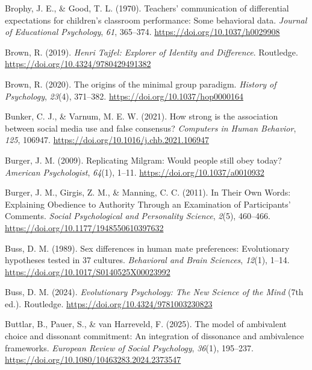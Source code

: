 \documentclass[
  letterpaper,
]{book}
\newlength{\cslhangindent}
\newenvironment{CSLReferences}[2] %
 {\begin{list}{}{%
  \setlength{\itemindent}{0pt}
  \setlength{\leftmargin}{0pt}
  \setlength{\parsep}{0pt}
  \ifodd #1
   \setlength{\leftmargin}{\cslhangindent}
   \setlength{\itemindent}{-1\cslhangindent}
  \fi
  \setlength{\itemsep}{#2\baselineskip}}}
 {\end{list}}
\begin{document}
\begin{CSLReferences}{1}{0}
Brophy, J. E., \& Good, T. L. (1970). Teachers' communication of
differential expectations for children's classroom performance: Some
behavioral data. \emph{Journal of Educational Psychology}, \emph{61},
365--374. \url{https://doi.org/10.1037/h0029908}

Brown, R. (2019). \emph{Henri {Tajfel}: {Explorer} of {Identity} and
{Difference}}. Routledge. \url{https://doi.org/10.4324/9780429491382}

Brown, R. (2020). The origins of the minimal group paradigm.
\emph{History of Psychology}, \emph{23}(4), 371--382.
\url{https://doi.org/10.1037/hop0000164}

Bunker, C. J., \& Varnum, M. E. W. (2021). How strong is the association
between social media use and false consensus? \emph{Computers in Human
Behavior}, \emph{125}, 106947.
\url{https://doi.org/10.1016/j.chb.2021.106947}

Burger, J. M. (2009). Replicating {Milgram}: {Would} people still obey
today? \emph{American Psychologist}, \emph{64}(1), 1--11.
\url{https://doi.org/10.1037/a0010932}

Burger, J. M., Girgis, Z. M., \& Manning, C. C. (2011). In {Their} {Own}
{Words}: {Explaining} {Obedience} to {Authority} {Through} an
{Examination} of {Participants}' {Comments}. \emph{Social Psychological
and Personality Science}, \emph{2}(5), 460--466.
\url{https://doi.org/10.1177/1948550610397632}

Buss, D. M. (1989). Sex differences in human mate preferences:
{Evolutionary} hypotheses tested in 37 cultures. \emph{Behavioral and
Brain Sciences}, \emph{12}(1), 1--14.
\url{https://doi.org/10.1017/S0140525X00023992}

Buss, D. M. (2024). \emph{Evolutionary {Psychology}: {The} {New}
{Science} of the {Mind}} (7th ed.). Routledge.
\url{https://doi.org/10.4324/9781003230823}

Buttlar, B., Pauer, S., \& van Harreveld, F. (2025). The model of
ambivalent choice and dissonant commitment: An integration of dissonance
and ambivalence frameworks. \emph{European Review of Social Psychology},
\emph{36}(1), 195--237.
\url{https://doi.org/10.1080/10463283.2024.2373547}


\end{CSLReferences}
\end{document}
